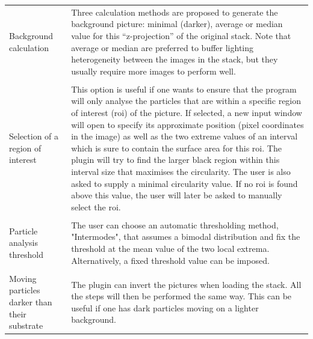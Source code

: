 \begin{longtable}{
	p{}%
 	p{}}
Background calculation & Three calculation methods are proposed to generate the
background picture: minimal (darker), average or median value for this
“z-projection” of the original stack. Note that average or median are preferred
to buffer lighting heterogeneity between the images in the stack, but they
usually require more images to perform well.\\
\hspace{1cm} &\\
Selection of a region of interest & This option is useful if one wants to ensure
that the program will only analyse the particles that are within a specific
region of interest (roi) of the picture. If selected, a new input window will
open to specify its approximate position (pixel coordinates in the image) as
well as the two extreme values of an interval which is sure to contain the
surface area for this roi. The plugin will try to find the larger black region
within this interval size that maximises the circularity. The user is also asked
to supply a minimal circularity value. If no roi is found above this value, the
user will later be asked to manually select the roi.\\
\hspace{1cm} &\\
Particle analysis threshold & The user can choose an automatic thresholding
method, "Intermodes", that assumes a bimodal distribution and fix the threshold
at the mean value of the two local extrema. Alternatively, a fixed threshold
value can be imposed.\\
\hspace{1cm} &\\
Moving particles darker than their substrate & The plugin can invert the
pictures when loading the stack. All the steps will then be performed the same
way. This can be useful if one has dark particles moving on a lighter
background.\\

\end{longtable}

